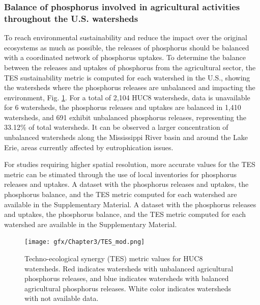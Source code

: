 \begin{refsection}[referencesCh3]
\subsubsection{Balance of phosphorus involved in agricultural activities throughout the U.S. watersheds}
To reach environmental sustainability and reduce the impact over the original ecosystems as much as possible, the releases of phosphorus should be balanced with a coordinated network of phosphorus uptakes. To determine the balance between the releases and uptakes of phosphorus from the agricultural sector, the TES sustainability metric is computed for each watershed in the U.S., showing the watersheds where the phosphorus releases are unbalanced and impacting the environment, Fig. \ref{fig:TES}. For a total of 2,104 HUC8 watersheds, data is unavailable for 6 watersheds, the phosphorus releases and uptakes are balanced in 1,410 watersheds, and 691 exhibit unbalanced phosphorus releases, representing the 33.12\% of total watersheds. It can be observed a larger concentration of unbalanced watersheds along the Mississippi River basin and around the Lake Erie, areas currently affected by eutrophication issues. 

For studies requiring higher spatial resolution, more accurate values for the TES metric can be stimated through the use of local inventories for phosphorus releases and uptakes. A dataset with the phosphorus releases and uptakes, the phosphorus balance, and the TES metric computed for each watershed are available in the Supplementary Material. A dataset with the phosphorus releases and uptakes, the phosphorus balance, and the TES metric computed for each watershed are available in the Supplementary Material.

\begin{figure}[h!] 
	\begin{adjustwidth}{}{}
		\centering
		\texttt{[image: gfx/Chapter3/TES\_mod.png]} 
		\caption{Techno-ecological synergy (TES) metric values for HUC8 watersheds. Red indicates watersheds with unbalanced agricultural phosphorus releases, and blue indicates watersheds with balanced agricultural phosphorus releases. White color indicates watersheds with not available data.} 
		\label{fig:TES}
	\end{adjustwidth}{}
\end{figure}


\end{refsection}
